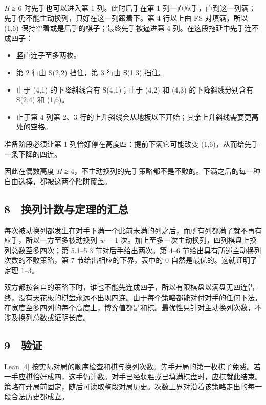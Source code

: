 \documentclass[
  a4paper,
]{article}
\providecommand{\tightlist}{%
  \setlength{\itemsep}{0pt}\setlength{\parskip}{0pt}}
\begin{document}
\emph{H} ≥ 6 时先手也可以进入第 1 列。此时后手在第 1
列一直应手，直到这一列满；先手仍不能主动换列，只好在这一列跟着下。第 4
行以上由 FS 对填满，所以 (1,6) 保持空着或是后手的棋子；最终先手被逼进第
4 列。在这段拖延中先手连不成四子：

\begin{itemize}
\tightlist
\item
  竖直连子至多两枚。
\item
  第 2 行由 S(2,2) 挡住，第 3 行由 S(1,3) 挡住。
\item
  止于 (4,1) 的下降斜线含有 S(4,1)；止于 (4,2) 和 (4,3)
  的下降斜线分别含有 S(2,4) 和 (1,6)。
\item
  止于第 4 列第 2、3
  行的上升斜线会从地板以下开始；其余上升斜线需要更高处的空格。
\end{itemize}

准备阶段必须让第 1 列恰好停在高度四：提前下满它可能改变
(1,6)，从而给先手一条下降的四连。

因此在偶数高度 \emph{H} ≥
4，不主动换列的先手策略都不是不败的。下满之后的每一种自由选择，都被这两个陷阱覆盖。

\subsection{8 换列计数与定理的汇总}\label{ux6362ux5217ux8ba1ux6570ux4e0eux5b9aux7406ux7684ux6c47ux603b}

每次被动换列都发生在对手下满一个此前未满的列之后，而所有列都满了就不再有应手，所以一方至多被动换列
\emph{w} − 1 次。加上至多一次主动换列，四列棋盘上换列总数至多四次；第
5.1--5.3 节对后手给出两次。第 4--6
节给出具有所述主动换列次数的不败策略，第 7 节给出相应的下界，表中的 0
自然是最优的。这就证明了定理 1--3。

双方都按各自的策略下时，谁也不能先连成四子，所以有限棋盘以满盘无四连告终，没有天花板的棋盘永远不出现四连。由于每个策略都能对付对手的任何下法，在宽度至多四列的每个高度上，博弈值都是和棋。最优性只针对主动换列次数，不涉及换列总数或证明长度。

\subsection{9　验证}\label{ux9a8cux8bc1}

Lean {[}4{]}
按实际对局的顺序检查和棋与换列次数。先手开局的第一枚棋子免费。若一手应棋恰好成四，这手仍计数。对手已经获胜或已填满棋盘时，应棋就此结束。策略在开局前固定，随后可读取整段对局历史。次数上界对沿着该策略走出的每一段合法历史都成立。
\end{document}

